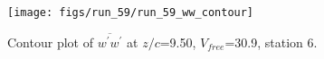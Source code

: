 \begin{figure}[H]
\centering
\texttt{[image: figs/run\_59/run\_59\_ww\_contour]}
\caption{Contour plot of $\overline{w^\prime w^\prime}$ at $z/c$=9.50, $V_{free}$=30.9, station 6.}
\label{fig:run_59_ww_contour}
\end{figure}


